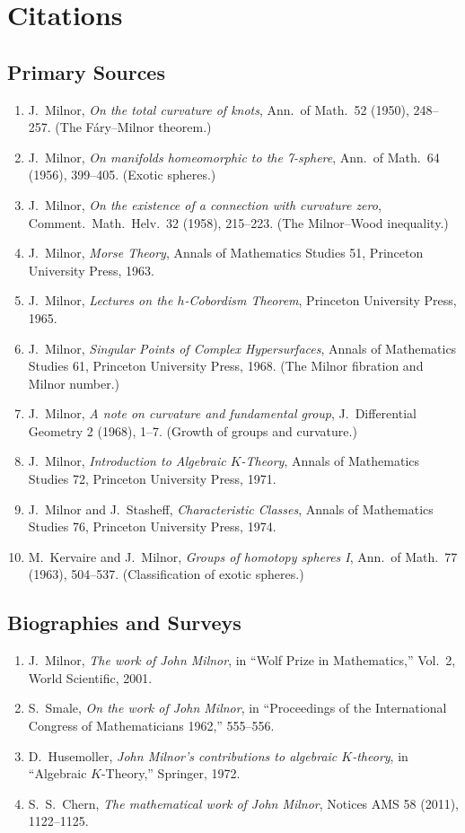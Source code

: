 \section{Citations}\subsection*{Primary Sources}
\begin{enumerate}
    \item J.\ Milnor, \textit{On the total curvature of knots}, Ann.\ of Math.\ 52 (1950), 248--257. (The F\'ary--Milnor theorem.)
    \item J.\ Milnor, \textit{On manifolds homeomorphic to the 7-sphere}, Ann.\ of Math.\ 64 (1956), 399--405. (Exotic spheres.)
    \item J.\ Milnor, \textit{On the existence of a connection with curvature zero}, Comment.\ Math.\ Helv.\ 32 (1958), 215--223. (The Milnor--Wood inequality.)
    \item J.\ Milnor, \textit{Morse Theory}, Annals of Mathematics Studies 51, Princeton University Press, 1963.
    \item J.\ Milnor, \textit{Lectures on the \(h\)-Cobordism Theorem}, Princeton University Press, 1965.
    \item J.\ Milnor, \textit{Singular Points of Complex Hypersurfaces}, Annals of Mathematics Studies 61, Princeton University Press, 1968. (The Milnor fibration and Milnor number.)
    \item J.\ Milnor, \textit{A note on curvature and fundamental group}, J.\ Differential Geometry 2 (1968), 1--7. (Growth of groups and curvature.)
    \item J.\ Milnor, \textit{Introduction to Algebraic \(K\)-Theory}, Annals of Mathematics Studies 72, Princeton University Press, 1971.
    \item J.\ Milnor and J.\ Stasheff, \textit{Characteristic Classes}, Annals of Mathematics Studies 76, Princeton University Press, 1974.
    \item M.\ Kervaire and J.\ Milnor, \textit{Groups of homotopy spheres I}, Ann.\ of Math.\ 77 (1963), 504--537. (Classification of exotic spheres.)
\end{enumerate}

\subsection*{Biographies and Surveys}
\begin{enumerate}
    \item J.\ Milnor, \textit{The work of John Milnor}, in ``Wolf Prize in Mathematics,'' Vol.\ 2, World Scientific, 2001.
    \item S.\ Smale, \textit{On the work of John Milnor}, in ``Proceedings of the International Congress of Mathematicians 1962,'' 555--556.
    \item D.\ Husemoller, \textit{John Milnor's contributions to algebraic \(K\)-theory}, in ``Algebraic \(K\)-Theory,'' Springer, 1972.
    \item S.\ S.\ Chern, \textit{The mathematical work of John Milnor}, Notices AMS 58 (2011), 1122--1125.
\end{enumerate}

